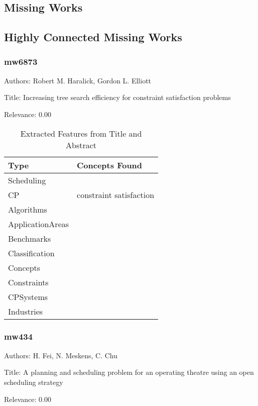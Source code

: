 \subsection{Missing Works}

\subsection{Highly Connected Missing Works}

\subsubsection{mw6873}
\label{mw:mw6873}

Authors: Robert M. Haralick, Gordon L. Elliott

Title: Increasing tree search efficiency for constraint satisfaction problems

Relevance:  0.00

{\scriptsize
\begin{longtable}{p{2cm}p{20cm}}
\caption{Extracted Features from Title and Abstract}\\ \toprule
Type & Concepts Found\\ \midrule
\endhead
\bottomrule
\endfoot
Scheduling & \\ 
CP & constraint satisfaction\\ 
Algorithms & \\ 
ApplicationAreas & \\ 
Benchmarks & \\ 
Classification & \\ 
Concepts & \\ 
Constraints & \\ 
CPSystems & \\ 
Industries & \\ 
\end{longtable}
}



\subsubsection{mw434}
\label{mw:mw434}

Authors: H. Fei, N. Meskens, C. Chu

Title: A planning and scheduling problem for an operating theatre using an open scheduling strategy

Relevance:  0.00

